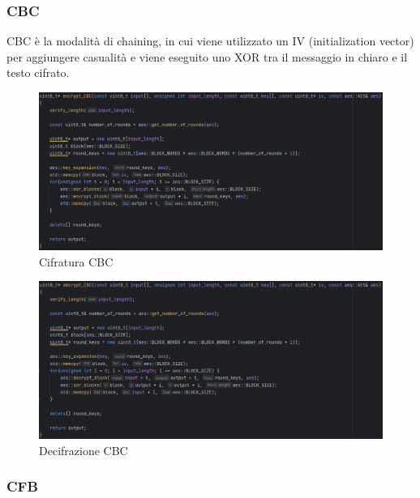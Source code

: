\subsubsection{CBC}

\textsf{\small CBC è la modalità di chaining, in cui viene utilizzato un IV (initialization vector) per aggiungere casualità e viene eseguito uno XOR tra il messaggio in chiaro e il testo cifrato.} %

\begin{figure}[H]
	\centering
	\includegraphics[width=1\textwidth, height=1\textheight, keepaspectratio]{./images/code/cpp/modes/encrypt_CBC.PNG}
	\caption{Cifratura CBC}
	\label{fig:encrypt_CBC}
\end{figure}

\textsf{\small } %

\begin{figure}[H]
	\centering
	\includegraphics[width=1\textwidth, height=1\textheight, keepaspectratio]{./images/code/cpp/modes/decrypt_CBC.PNG}
	\caption{Decifrazione CBC}
	\label{fig:decrypt_CBC}
\end{figure}

\subsubsection{CFB}


